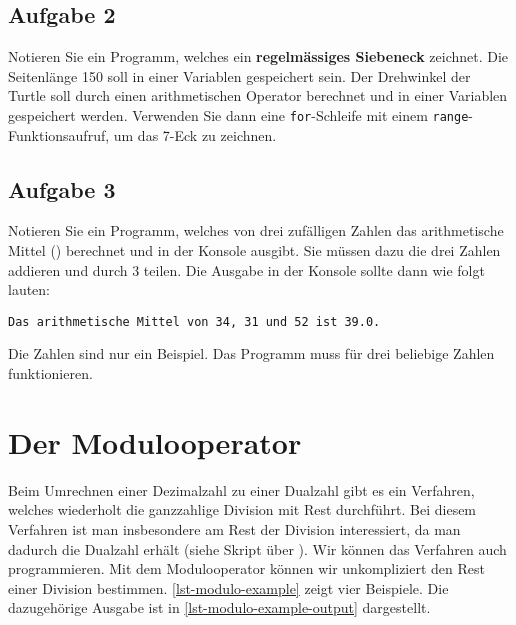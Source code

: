 
\newpage

\subsection{Aufgabe 2}

Notieren Sie ein Programm, welches ein \textbf{regelmässiges Siebeneck} zeichnet. Die Seitenlänge \num{150} soll in einer Variablen gespeichert sein. Der Drehwinkel der Turtle soll durch einen arithmetischen Operator berechnet und in einer Variablen gespeichert werden. Verwenden Sie dann eine \lstinline{for}-Schleife mit einem \lstinline{range}-Funktionsaufruf, um das \num{7}-Eck zu zeichnen.

\fillwithgrid{1.9in}

\subsection{Aufgabe 3}

Notieren Sie ein Programm, welches von drei zufälligen Zahlen das arithmetische Mittel () berechnet und in der Konsole ausgibt. Sie müssen dazu die drei Zahlen addieren und durch \num{3} teilen. Die Ausgabe in der Konsole sollte dann wie folgt lauten:

\begin{lstlisting}[language=output]
Das arithmetische Mittel von 34, 31 und 52 ist 39.0.
\end{lstlisting}

Die Zahlen sind nur ein Beispiel. Das Programm muss für drei beliebige Zahlen funktionieren.

\fillwithgrid{1.9in}

\section{Der Modulooperator}

Beim Umrechnen einer Dezimalzahl zu einer Dualzahl gibt es ein Verfahren, welches wiederholt die ganzzahlige Division mit Rest durchführt. Bei diesem Verfahren ist man insbesondere am Rest der Division interessiert, da man dadurch die Dualzahl erhält (siehe Skript über ). Wir können das Verfahren auch programmieren. Mit dem Modulooperator können wir unkompliziert den Rest einer Division bestimmen. \autoref{lst-modulo-example} zeigt vier Beispiele. Die dazugehörige Ausgabe ist in \autoref{lst-modulo-example-output} dargestellt.

